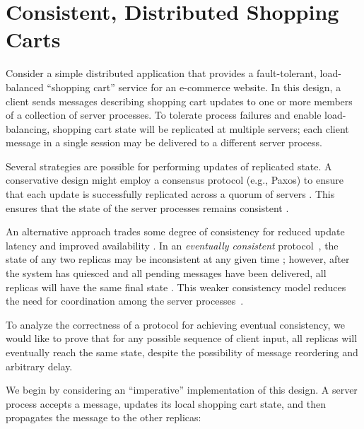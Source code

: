 \section{Consistent, Distributed Shopping Carts}
\label{sec:motivation}

Consider a simple distributed application that provides a fault-tolerant, load-balanced
``shopping cart'' service for an e-commerce website. In this design, a client
sends messages describing shopping cart updates to one or more members of a collection of server
processes. To tolerate process failures and enable load-balancing, shopping cart state will be replicated
at multiple servers; each client message in a single session may be delivered to a different server process.

Several strategies are possible for performing updates of replicated state. A
conservative design might employ a consensus protocol (e.g., Paxos\cite{part-time})
to ensure that each update is successfully replicated across a quorum of servers . This
ensures that the state of the server processes remains consistent .

An alternative approach trades some degree of consistency for reduced update
latency and improved availability . In an \emph{eventually consistent}
protocol~\cite{quicksand,beyond}, the state of any two replicas may be
inconsistent at any given time ; however, after the system has quiesced and all
pending messages have been delivered, all replicas will have the same final
state . This weaker consistency model reduces the need for coordination among the
server processes~\cite{dynamo}.

To analyze the correctness of a protocol for achieving eventual consistency, we
would like to prove that for any possible sequence of client input, all
replicas will eventually reach the same state, despite the possibility of
message reordering and arbitrary delay.

We begin by considering an ``imperative''  implementation of this design. A
server process accepts a message, updates its local shopping cart state, and
then propagates the message to the other replicas:

